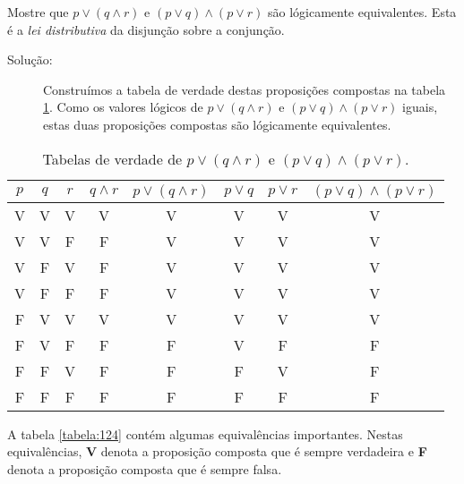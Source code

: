 \label{exem123}
\begin{exmp}
Mostre que $p \lor (q \land r)$ e $(p \lor q) \land (p \lor r)$ são lógicamente
equivalentes. Esta é a \emph{lei distributiva} da disjunção sobre a conjunção.
\end{exmp}

\begin{description}
\item[Solução:] Construímos a tabela de verdade destas proposições compostas na
tabela \ref{tabela:123}. Como os valores lógicos de $p \lor (q \land r)$ e $(p
\lor q) \land (p \lor r)$ iguais, estas duas proposições compostas são
lógicamente equivalentes.
\end{description}

\begin{table}[H]
	\centering
	\begin{tabular}{|c|c|c|c|c|c|c|c|}%
	\toprule
	\textbf{$p$} & \textbf{$q$} & \textbf{$r$} & \textbf{$q \land r$} &
	\textbf{$p \lor (q \land r)$} & \textbf{$p \lor q$} & \textbf{$p \lor r$} &
	\textbf{$(p \lor q) \land (p \lor r)$}\\
	\midrule
	V & V & V & V & V & V & V & V\\
	V & V & F & F & V & V & V & V\\
	V & F & V & F & V & V & V & V\\
	V & F & F & F & V & V & V & V\\
	F & V & V & V & V & V & V & V\\
	F & V & F & F & F & V & F & F\\
	F & F & V & F & F & F & V & F\\
	F & F & F & F & F & F & F & F\\
	\bottomrule%
	\end{tabular}%
	\caption{Tabelas de verdade de $p \lor (q \land r)$ e $(p \lor q) \land (p \lor
	r)$.}
	\label{tabela:123}
\end{table}
A tabela \ref{tabela:124} contém algumas equivalências importantes. Nestas
equivalências, \textbf{V} denota a proposição composta que é sempre verdadeira e
\textbf{F} denota a proposição composta que é sempre falsa.


